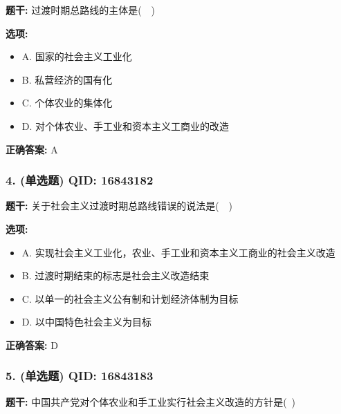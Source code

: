 \documentclass[12pt,UTF8]{ctexart}
\begin{document}
\textbf{题干:}
过渡时期总路线的主体是(  )

\textbf{选项:}
\begin{itemize}[leftmargin=*]

  \item A. 国家的社会主义工业化

  \item B. 私营经济的国有化

  \item C. 个体农业的集体化

  \item D. 对个体农业、手工业和资本主义工商业的改造

\end{itemize}

\textbf{正确答案:}
A

\vspace{0.3em}\hrulefill\vspace{0.7em}

\subsubsection*{4. (单选题) \small QID: 16843182}

\textbf{题干:}
关于社会主义过渡时期总路线错误的说法是(  )

\textbf{选项:}
\begin{itemize}[leftmargin=*]

  \item A. 实现社会主义工业化，农业、手工业和资本主义工商业的社会主义改造

  \item B. 过渡时期结束的标志是社会主义改造结束

  \item C. 以单一的社会主义公有制和计划经济体制为目标

  \item D. 以中国特色社会主义为目标

\end{itemize}

\textbf{正确答案:}
D

\vspace{0.3em}\hrulefill\vspace{0.7em}

\subsubsection*{5. (单选题) \small QID: 16843183}

\textbf{题干:}
中国共产党对个体农业和手工业实行社会主义改造的方针是( )
\end{document}
